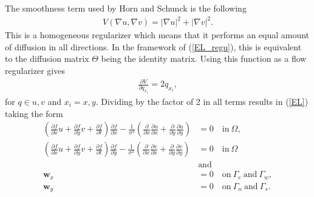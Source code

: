 \documentclass[10pt,a4paper]{article}
\begin{document}
The smoothness term used by Horn and Schunck is the following
\begin{align*}
V(\nabla u, \nabla v) = |\nabla u|^2 + |\nabla v|^2.
\end{align*}
This is a homogeneous regularizer which means that it performs an equal amount of diffusion in all directions. In the framework of (\ref{EL_regu}), this is equivalent to the diffusion matrix $\Theta$ being the identity matrix. Using this function as a flow regularizer gives
\begin{align*}
\frac{\partial V}{\partial q_{x_i}} = 2q_{x_i},
\end{align*}
for $q \in u,v$ and $x_i = x, y$. Dividing by the factor of 2 in all terms results in (\ref{EL}) taking the form 
\begin{equation}
\label{EL_HS}
\begin{aligned}
(\frac{\partial f}{\partial x}u + \frac{\partial f}{\partial y}v + \frac{\partial f}{\partial t}) \frac{\partial f}{\partial x} - \frac{1}{\sigma^2}(\frac{\partial}{\partial x} \frac{\partial u}{\partial x} + \frac{\partial}{\partial y} \frac{\partial u}{\partial y} ) &= 0  \quad \text{in} \ \Omega,  \\
(\frac{\partial f}{\partial x}u + \frac{\partial f}{\partial y}v + \frac{\partial f}{\partial t}) \frac{\partial f}{\partial y} - \frac{1}{\sigma^2}(\frac{\partial}{\partial x} \frac{\partial v}{\partial x} + \frac{\partial}{\partial y} \frac{\partial v}{\partial y} ) &= 0  \quad \text{in} \ \Omega  \\
& \text{and} \\
\textbf{w}_{x} &= 0 \quad \text{on} \ \Gamma_e \ \text{and} \ \Gamma_w, \\
\textbf{w}_{y} &= 0 \quad \text{on} \ \Gamma_n \ \text{and} \ \Gamma_s.
\end{aligned}
\end{equation}
\end{document}
